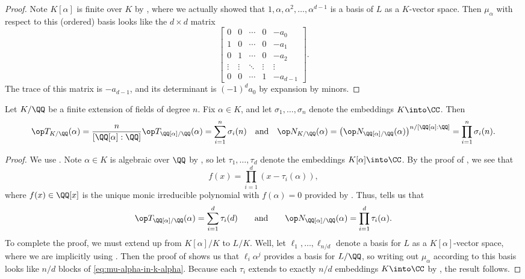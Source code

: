 \documentclass[../notes.tex]{subfiles}
\begin{document}
\begin{proof}
	Note $K[\alpha]$ is finite over $K$ by , where we actually showed that $1,\alpha,\alpha^2,\ldots,\alpha^{d-1}$ is a basis of $L$ as a $K$-vector space. Then $\mu_\alpha$ with respect to this (ordered) basis looks like the $d\times d$ matrix
	\begin{equation}
		\begin{bmatrix}
			0 & 0 & \cdots & 0 & -a_0 \\
			1 & 0 & \cdots & 0 & -a_1 \\
			0 & 1 & \cdots & 0 & -a_2 \\
			\vdots & \vdots & \ddots & \vdots & \vdots \\
			0 & 0 & \cdots & 1 & -a_{d-1}
		\end{bmatrix}. \label{eq:mu-alpha-in-k-alpha}
	\end{equation}
	The trace of this matrix is $-a_{d-1}$, and its determinant is $(-1)^da_0$ by expansion by minors.
\end{proof}
\begin{corollary} \label{cor:norm-tr-by-embeds}
	Let $K/\QQ$ be a finite extension of fields of degree $n$. Fix $\alpha\in K$, and let $\sigma_1,\ldots,\sigma_n$ denote the embeddings $K\into\CC$. Then
	\[\op T_{K/\QQ}(\alpha)=\frac n{[\QQ[\alpha]:\QQ]}\op T_{\QQ[\alpha]/\QQ}(\alpha)=\sum_{i=1}^n\sigma_i(n)\quad\text{and}\quad\op N_{K/\QQ}(\alpha)=\left(\op N_{\QQ[\alpha]/\QQ}(\alpha)\right)^{n/[\QQ[\alpha]:\QQ]}=\prod_{i=1}^n\sigma_i(n).\]
\end{corollary}
\begin{proof}
	We use . Note $\alpha\in K$ is algebraic over $\QQ$ by , so let $\tau_1,\ldots,\tau_d$ denote the embeddings $K[\alpha]\into\CC$. By the proof of , we see that
	\[f(x)=\prod_{i=1}^d(x-\tau_i(\alpha)),\]
	where $f(x)\in\QQ[x]$ is the unique monic irreducible polynomial with $f(\alpha)=0$ provided by . Thus,  tells us that
	\[\op T_{\QQ[\alpha]/\QQ}(\alpha)=\sum_{i=1}^d\tau_i(d)\qquad\text{and}\qquad\op N_{\QQ[\alpha]/\QQ}(\alpha)=\prod_{i=1}^d\tau_i(\alpha).\]
	To complete the proof, we must extend up from $K[\alpha]/K$ to $L/K$. Well, let $\ell_1,\ldots,\ell_{n/d}$ denote a basis for $L$ as a $K[\alpha]$-vector space, where we are implicitly using . Then the proof of  shows us that $\ell_i\alpha^j$ provides a basis for $L/\QQ$, so writing out $\mu_\alpha$ according to this basis looks like $n/d$ blocks of \eqref{eq:mu-alpha-in-k-alpha}. Because each $\tau_i$ extends to exactly $n/d$ embeddings $K\into\CC$ by , the result follows.
\end{proof}
\end{document}
